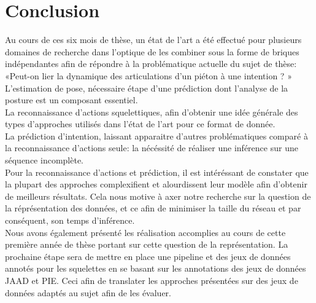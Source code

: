 \clearpage
\chapter{Conclusion}
\label{sec:SOTA}

Au cours de ces six mois de thèse, un état de l'art a été effectué pour plusieurs domaines de recherche dans l'optique de les combiner sous la forme de briques indépendantes afin de répondre à la problématique actuelle du sujet de thèse: «Peut-on lier la dynamique des articulations d'un piéton à une intention ? »\\

L'estimation de pose, nécessaire étape d'une prédiction dont l'analyse de la posture est un composant essentiel.\\
La reconnaissance d'actions squelettiques, afin d'obtenir une idée générale des types d'approches utilisés dans l'état de l'art pour ce format de donnée.\\
La prédiction d'intention, laissant apparaitre d'autres problématiques comparé à la reconnaissance d'actions seule: la nécéssité de réaliser une inférence sur une séquence incomplète.\\

Pour la reconnaissance d'actions et prédiction, il est intéréssant de constater que la plupart des approches complexifient et alourdissent leur modèle afin d'obtenir de meilleurs résultats. Cela nous motive à axer notre recherche sur la question de la réprésentation des données, et ce afin de minimiser la taille du réseau et par conséquent, son temps d'inférence.\\

Nous avons également présenté les réalisation accomplies au cours de cette première année de thèse portant sur cette question de la représentation. La prochaine étape sera de mettre en place une pipeline et des jeux de données annotés pour les squelettes en se basant sur les annotations des jeux de données JAAD et PIE. Ceci afin de translater les approches présentées sur des jeux de données adaptés au sujet afin de les évaluer.